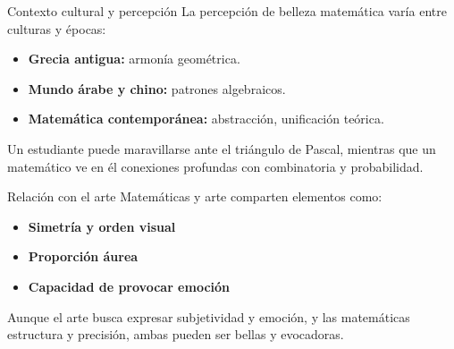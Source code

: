 \documentclass[final]{beamer}
\begin{document}
\begin{frame}[t]
\begin{columns}[t]
\begin{column}{0.48\textwidth}
\begin{block}{Contexto cultural y percepción}
La percepción de belleza matemática varía entre culturas y épocas:
\begin{itemize}
    \item \textbf{Grecia antigua:} armonía geométrica.
    \item \textbf{Mundo árabe y chino:} patrones algebraicos.
    \item \textbf{Matemática contemporánea:} abstracción, unificación teórica.
\end{itemize}
Un estudiante puede maravillarse ante el triángulo de Pascal, mientras que un matemático ve en él conexiones profundas con combinatoria y probabilidad.
\end{block}

\begin{block}{Relación con el arte}
Matemáticas y arte comparten elementos como:
\begin{itemize}
    \item \textbf{Simetría y orden visual}
    \item \textbf{Proporción áurea}
    \item \textbf{Capacidad de provocar emoción}
\end{itemize}
Aunque el arte busca expresar subjetividad y emoción, y las matemáticas estructura y precisión, ambas pueden ser bellas y evocadoras.
\end{block}

\end{column}
\end{columns}


\vspace{1cm}


\end{frame}
\end{document}
